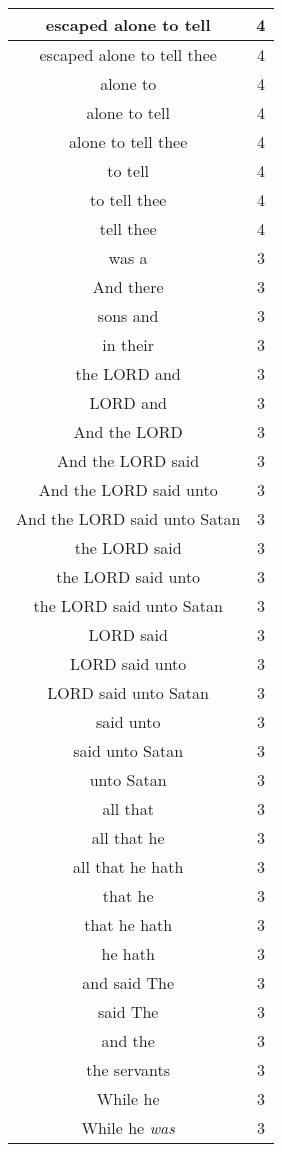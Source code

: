 \begin{center}
\begin{longtable}{|c|c|}
escaped alone to tell & 4\\ \hline 
escaped alone to tell thee & 4\\ \hline 
alone to & 4\\ \hline 
alone to tell & 4\\ \hline 
alone to tell thee & 4\\ \hline 
to tell & 4\\ \hline 
to tell thee & 4\\ \hline 
tell thee & 4\\ \hline 
was a & 3\\ \hline 
And there & 3\\ \hline 
sons and & 3\\ \hline 
in their & 3\\ \hline 
the LORD and & 3\\ \hline 
LORD and & 3\\ \hline 
And the LORD & 3\\ \hline 
And the LORD said & 3\\ \hline 
And the LORD said unto & 3\\ \hline 
And the LORD said unto Satan & 3\\ \hline 
the LORD said & 3\\ \hline 
the LORD said unto & 3\\ \hline 
the LORD said unto Satan & 3\\ \hline 
LORD said & 3\\ \hline 
LORD said unto & 3\\ \hline 
LORD said unto Satan & 3\\ \hline 
said unto & 3\\ \hline 
said unto Satan & 3\\ \hline 
unto Satan & 3\\ \hline 
all that & 3\\ \hline 
all that he & 3\\ \hline 
all that he hath & 3\\ \hline 
that he & 3\\ \hline 
that he hath & 3\\ \hline 
he hath & 3\\ \hline 
and said The & 3\\ \hline 
said The & 3\\ \hline 
and the & 3\\ \hline 
the servants & 3\\ \hline 
While he & 3\\ \hline 
While he \emph{was} & 3\\ \hline 

\end{longtable}
\end{center}
